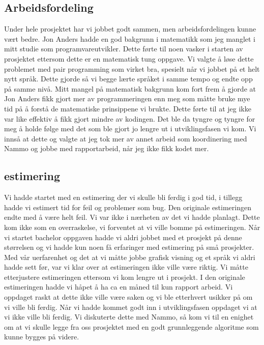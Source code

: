 	
\subsection{Arbeidsfordeling}
Under hele prosjektet har vi jobbet godt sammen, men arbeidsfordelingen kunne vært bedre. Jon Anders hadde en god bakgrunn i matematikk som jeg manglet i mitt studie som programvareutvikler. Dette førte til noen vasker i starten av prosjektet ettersom dette er en matematisk tung oppgave. Vi valgte å løse dette problemet med pair programming som virket bra, spesielt når vi jobbet på et helt nytt språk. Dette gjorde så vi begge lærte språket i samme tempo og endte opp på samme nivå. Mitt mangel på matematisk bakgrunn kom fort frem å gjorde at Jon Anders fikk gjort mer av programmeringen enn meg som måtte bruke mye tid på å forstå de matematiske prinsippene vi brukte. Dette førte til at jeg ikke var like effektiv å fikk gjort mindre av kodingen. Det ble da tyngre og tyngre for meg å holde følge med det som ble gjort jo lengre ut i utviklingsfasen vi kom. Vi innså at dette og valgte at jeg tok mer av annet arbeid som koordinering med Nammo og jobbe med rapportarbeid, når jeg ikke fikk kodet mer.



\subsection{estimering}
Vi hadde startet med en estimering der vi skulle bli ferdig i god tid, i tillegg hadde vi estimert tid for feil og problemer som bug. Den originale estimeringen endte med å være helt feil. Vi var ikke i nærheten av det vi hadde planlagt. Dette kom ikke som en overraskelse, vi forventet at vi ville bomme på estimeringen. Når vi startet bachelor oppgaven hadde vi aldri jobbet med et prosjekt på denne størrelsen og vi hadde kun noen få erfaringer med estimering på små prosjekter. Med vår uerfarenhet og det at vi måtte jobbe grafisk visning og et språk vi aldri hadde sett før, var vi klar over at estimeringen ikke ville være riktig. Vi måtte etterjustere estimeringen ettersom vi kom lengre ut i prosjekt. I den originale estimeringen hadde vi håpet å ha ca en måned til kun rapport arbeid. Vi oppdaget raskt at dette ikke ville være saken og vi ble etterhvert usikker på om vi ville bli ferdig. Når vi hadde kommet godt inn i utviklingsfasen oppdaget vi at vi ikke ville bli ferdig. Vi diskuterte dette med Nammo, så kom vi til en enighet om at vi skulle legge fra oss prosjektet med en godt grunnleggende algoritme som kunne bygges på videre.

